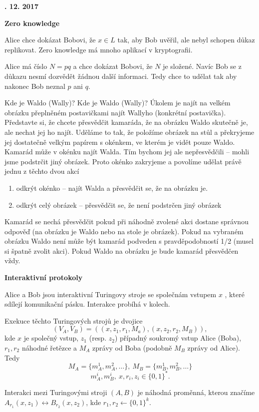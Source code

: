 \documentclass[a4paper,12pt,titlepage]{article}
\def\podnadpis#1{{\bigskip\bf\noindent#1\medskip\par}}
\begin{document}
\podnadpis{21. 12. 2017}

\podnadpis{Zero knowledge}

Alice chce dokázat Bobovi, že $x\in L$ tak, aby Bob uvěřil, ale nebyl schopen důkaz replikovat. Zero knowledge má mnoho aplikací v kryptografii.


Alice má číslo $N=pq$ a chce dokázat Bobovi, že $N$ je složené. Navíc Bob se z důkazu nesmí dozvědět žádnou další informaci. Tedy chce to udělat tak aby nakonec Bob neznal $p$ ani $q$.

\noindent Kde je Waldo (Wally)?
Kde je Waldo (Wally)? Úkolem je najít na velkém obrázku přeplněném postavičkami najít Wallyho (konkrétní postavička). Představte si, že chcete přesvědčit kamaráda, že na obrázku Waldo skutečně je, ale nechat jej ho najít. Uděláme to tak, že položíme obrázek na stůl a překryjeme jej dostatečně velkým papírem s okénkem, ve kterém je vidět pouze Waldo. Kamarád může v okénku najít Walda. Tím bychom jej ale nepřesvědčili -- mohli jsme podstrčit jiný obrázek. Proto okénko zakryjeme a povolíme udělat právě jednu z těchto dvou akcí
\begin{enumerate}
	\item  odkrýt okénko -- najít Walda a přesvědčit se, že na obrázku je.
	\item  odkrýt celý obrázek -- přesvědčit se, že není podstrčen jiný obrázek
	\end{enumerate}
	Kamarád se nechá přesvědčit pokud při náhodně zvolené akci dostane správnou odpověď (na obrázku je Waldo nebo na stole je obrázek).
	Pokud na vybraném obrázku Waldo není může být kamarád podveden s pravděpodobností 1/2 (musel si špatně zvolit akci). Pokud Waldo na obrázku je bude kamarád přesvědčen vždy.

\podnadpis{Interaktivní protokoly}

Alice a Bob jsou interaktivní Turingovy stroje se společnám vstupem $x$ , které sdílejí komunikační pásku. Interakce probíhá v kolech.

Exekuce těchto Turingových strojů je dvojice
$$(V_A,V_B)=((x,z_1,r_1,M_a),(x,z_2,r_2,M_B)),$$
kde $x$ je společný vstup, $z_1$ (resp. $z_2$) případný soukromý vstup Alice (Boba), $r_1,r_2$ náhodné řetězce a $M_A$ zprávy od Boba (podobně $M_B$ zprávy od Alice). Tedy
$$M_A=\{m_A^1,m_A^2, \dots\},\ M_B=\{m_B^1,m_B^2, \dots\}$$
$$m_A^i,m_B^i,\ x,r_i,z_i\in \{0,1\}^*.$$

Interakci mezi Turingovými stroji $(A,B)$ je náhodná
proměnná, kterou značíme $A_{r_1}(x,z_1)\leftrightarrow
B_{r_2}(x,z_2)$, kde $r_1,r_2 \leftarrow \{0,1\}^k$.
\end{document}
